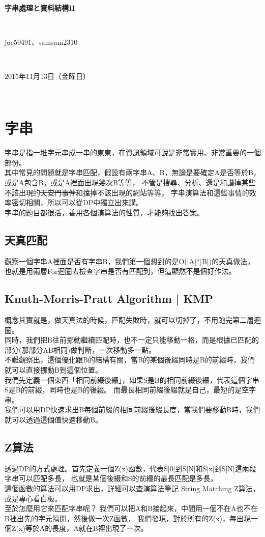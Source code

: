 \documentclass{article}
\title{\hmwkClass}
\author{\hmwkAuthorName}
\date{\hmwkDueDate}
\def\normalsize{\fontsize{12}{16}\selectfont}
\def\large{\fontsize{16}{24}\selectfont}
\def\LARGE{\fontsize{24}{36}\selectfont}
\newcommand{\hmwkDueDate}{2015年11月13日（金曜日）} %
\newcommand{\hmwkClass}{字串處理と資料結構II} %
\newcommand{\hmwkAuthorName}{joe59491、samsam2310} %
\begin{document}
\LARGE~\\[4ex]
\centerline{\bf\hmwkClass}\large\\[2ex]\centerline{\hmwkAuthorName}\\[2ex]\centerline{\hmwkDueDate}\\
\normalsize


\section{字串}
字串是指一堆字元串成一串的東東，在資訊領域可說是非常實用、非常重要的一個部份。\\
其中常見的問題就是字串匹配，假設有兩字串A、B，無論是要確定A是否等於B，
或是A包含B，或是A裡面出現幾次B等等，
不管是搜尋、分析、還是和諧掉某些不該出現的\sout{天安門事件}和擋掉不該出現的網站等等，
字串演算法和這些事情的效率密切相關，所以可以從DP中獨立出來講。\\
字串的題目都很活，善用各個演算法的性質，才能夠找出答案。

\subsection{天真匹配}
觀察一個字串A裡面是否有字串B，我們第一個想到的是O(|A|*|B|)的天真做法，
也就是用兩層For迴圈去檢查字串是否有匹配到，但這顯然不是個好作法。

\subsection{Knuth-Morris-Pratt Algorithm | KMP}
概念其實就是，做天真法的時候，匹配失敗時，就可以切掉了，不用跑完第二層迴圈。\\
同時，我們把B往前挪動繼續匹配時，也不一定只能移動一格，而是根據已匹配的部分(那部分AB相同)做判斷，一次移動多一點。\\
不難觀察出，這個優化跟B的結構有關，當B的某個後綴同時是B的前綴時，我們就可以直接挪動B到這個位置。\\
我們先定義一個東西「相同前綴後綴」，如果S是B的相同前綴後綴，代表這個字串S是B的前綴，同時也是B的後綴。
而最長相同前綴後綴就是自己，最短的是空字串。\\
我們可以用DP快速求出B每個前綴的相同前綴後綴長度，當我們要移動B時，我們就可以透過這個值快速移動B。

\subsection{Z算法}
透過DP的方式處理。首先定義一個Z(x)函數，代表S[0]到S[N]和S[x]到S[N]這兩段字串可以匹配多長，
也就是某個後綴和S的前綴的最長匹配是多長。\\
這個函數的算法可以用DP求出，詳細可以查演算法筆記 String Matching Z算法，或是專心看白板。\\
至於怎麼用它來匹配字串呢？
我們可以把A和B接起來，中間用一個不在A也不在B裡出先的字元隔開，然後做一次Z函數，
我們發現，對於所有的Z(x)，每出現一個Z(x)等於A的長度，A就在B裡出現了一次。
\end{document}
